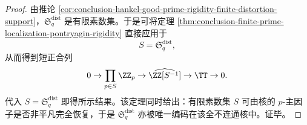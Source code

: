 \begin{proof}
由推论 \ref{cor:conclusion-hankel-good-prime-rigidity-finite-distortion-support}，\(\mathfrak S_q^{\mathrm{dist}}\) 是有限素数集。于是可将定理 \ref{thm:conclusion-finite-prime-localization-pontryagin-rigidity} 直接应用于
\[
S=\mathfrak S_q^{\mathrm{dist}},
\]
从而得到短正合列
\[
0\to \prod_{p\in S}\ZZ_p\to \widehat{\ZZ[S^{-1}]}\to \TT\to 0.
\]
代入 \(S=\mathfrak S_q^{\mathrm{dist}}\) 即得所示结果。该定理同时给出：有限素数集 \(S\) 可由核的 \(p\)-主因子是否非平凡完全恢复，于是 \(\mathfrak S_q^{\mathrm{dist}}\) 亦被唯一编码在该全不连通核中。证毕。
\end{proof}
